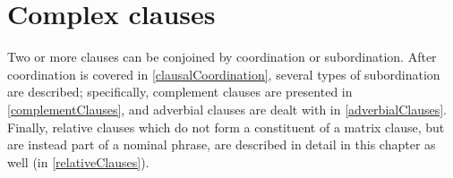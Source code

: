 



\chapter{Complex clauses}\label{complexClauses}%
Two or more clauses can be conjoined by coordination or subordination. %
After coordination is covered in \SEC\ref{clausalCoordination}, several types of subordination are described; specifically, complement clauses are presented in \SEC\ref{complementClauses}, and adverbial clauses are dealt with in \SEC\ref{adverbialClauses}. 
Finally, relative clauses which do not form a constituent of a matrix clause, but are instead part of a nominal phrase, are described in detail in this chapter as well (in \SEC\ref{relativeClauses}). 

